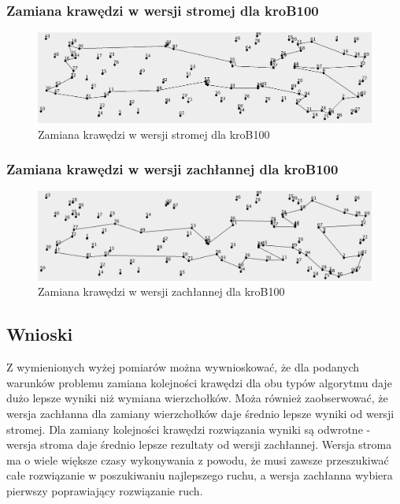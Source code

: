 \documentclass[a4paper]{article}
\begin{document}
\subsubsection{Zamiana krawędzi w wersji stromej dla kroB100}

\begin{figure}[H]
\centering
\includegraphics[width=\textwidth]{lab2/kroB_steepest_corners}
\caption{Zamiana krawędzi w wersji stromej dla kroB100}
\end{figure}

\subsubsection{Zamiana krawędzi w wersji zachłannej dla kroB100}

\begin{figure}[H]
\centering
\includegraphics[width=\textwidth]{lab2/kroB_greedy_corners}
\caption{Zamiana krawędzi w wersji zachłannej dla kroB100}
\end{figure}

\subsection{Wnioski}

Z wymienionych wyżej pomiarów można wywnioskować, że dla podanych warunków problemu zamiana kolejności krawędzi dla obu typów algorytmu daje dużo lepsze wyniki niż wymiana wierzchołków. Moża również zaobserwować, że wersja zachłanna dla zamiany wierzchołków daje średnio lepsze wyniki od wersji stromej. Dla zamiany kolejności krawędzi rozwiązania wyniki są odwrotne - wersja stroma daje średnio lepsze rezultaty od wersji zachłannej. Wersja stroma ma o wiele większe czasy wykonywania z powodu, że musi zawsze przeszukiwać całe rozwiązanie w poszukiwaniu najlepszego ruchu, a wersja zachłanna wybiera pierwszy poprawiający rozwiązanie ruch. 
\end{document}
